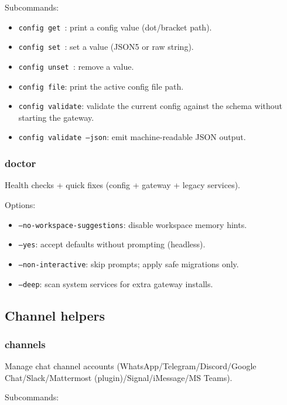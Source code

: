 Subcommands:

\begin{itemize}
  \item \texttt{config get }: print a config value (dot/bracket path).
  \item \texttt{config set  }: set a value (JSON5 or raw string).
  \item \texttt{config unset }: remove a value.
  \item \texttt{config file}: print the active config file path.
  \item \texttt{config validate}: validate the current config against the schema without starting the gateway.
  \item \texttt{config validate --json}: emit machine-readable JSON output.
\end{itemize}


\subsubsection{doctor}


Health checks + quick fixes (config + gateway + legacy services).

Options:

\begin{itemize}
  \item \texttt{--no-workspace-suggestions}: disable workspace memory hints.
  \item \texttt{--yes}: accept defaults without prompting (headless).
  \item \texttt{--non-interactive}: skip prompts; apply safe migrations only.
  \item \texttt{--deep}: scan system services for extra gateway installs.
\end{itemize}


\subsection{Channel helpers}


\subsubsection{channels}


Manage chat channel accounts (WhatsApp/Telegram/Discord/Google Chat/Slack/Mattermost (plugin)/Signal/iMessage/MS Teams).

Subcommands:

